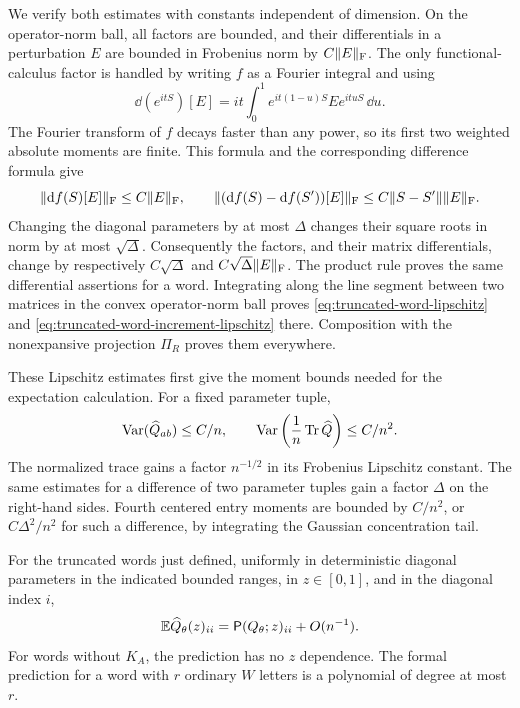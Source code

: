 We verify both estimates with constants independent of dimension.
On the operator-norm ball, all factors are bounded, and their
differentials in a perturbation $E$ are bounded in Frobenius norm
by $C\lVert E\rVert_{\mathrm F}$.  The only functional-calculus factor is
handled by writing $f$ as a Fourier integral and using
\[
 \dd(e^{itS})[E]
 =it\int_0^1 e^{it(1-u)S}E e^{ituS}\,\dd u.
\]
The Fourier transform of $f$ decays faster than any power, so its
first two weighted absolute moments are finite.  This formula and
the corresponding difference formula give
\[
 \lVert \mathrm d f(S)[E]\rVert_{\mathrm F}\le C\lVert E\rVert_{\mathrm F},\qquad
 \lVert (\mathrm d f(S)-\mathrm d f(S'))[E]\rVert_{\mathrm F}
 \le C\lVert S-S'\rVert\lVert E\rVert_{\mathrm F}.
\]
Changing the diagonal parameters by at most $\Delta$ changes their
square roots in norm by at most $\sqrt\Delta$.  Consequently the
factors, and their matrix differentials, change by respectively
$C\sqrt\Delta$ and $C\sqrt\Delta\lVert E\rVert_{\mathrm F}$.  The product rule
proves the same differential assertions for a word.  Integrating
along the line segment between two matrices in the convex
operator-norm ball proves \eqref{eq:truncated-word-lipschitz} and
\eqref{eq:truncated-word-increment-lipschitz} there.  Composition with
the nonexpansive projection $\Pi_R$ proves them everywhere.

These Lipschitz estimates first give the moment bounds needed for
the expectation calculation.  For a fixed parameter tuple,
\begin{equation}\label{eq:word-entry-and-trace-variance}
 \operatorname{Var}(\widehat Q_{ab})\le C/n,\qquad
 \operatorname{Var}\left(\frac1n\operatorname{Tr}\widehat Q\right)\le C/n^2.
\end{equation}
The normalized trace gains a factor $n^{-1/2}$ in its Frobenius
Lipschitz constant.  The same estimates for a difference of two
parameter tuples gain a factor $\Delta$ on the right-hand sides.
Fourth centered entry moments are bounded by $C/n^2$, or
$C\Delta^2/n^2$ for such a difference, by integrating the Gaussian
concentration tail.

\begin{lemma}
\label{lem:word-bias}
For the truncated words just defined, uniformly in deterministic
diagonal parameters in the indicated bounded ranges, in
$z\in[0,1]$, and in the diagonal index $i$,
\begin{equation}\label{eq:word-bias}
 \mathbb E\widehat Q_\theta(z)_{ii}
 =\mathsf P(Q_\theta;z)_{ii}+O(n^{-1}).
\end{equation}
For words without $K_A$, the prediction has no $z$ dependence.
The formal prediction for a word with $r$ ordinary $W$ letters is a
polynomial of degree at most $r$.
\end{lemma}

